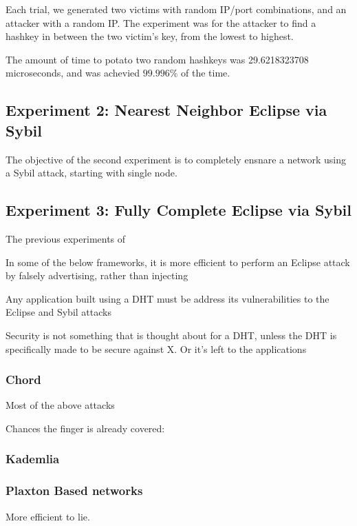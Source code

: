 \documentclass[10pt,a4paper]{article}
\begin{document}
Each trial, we generated two victims with random IP/port combinations, and an attacker with a random IP.
The experiment was for the attacker to find a hashkey in between the two victim's key, from the lowest to highest.

The amount of time to potato two random hashkeys was 29.6218323708 microseconds, and was achevied $ 99.996\%$ of the time.



\subsection{Experiment 2:  Nearest Neighbor Eclipse via Sybil}
The objective of the second experiment is to completely ensnare a network using a Sybil attack, starting with single node.


\subsection{Experiment 3: Fully Complete Eclipse via Sybil}
The previous experiments of

In some of the below frameworks, it is more efficient to perform an Eclipse attack by falsely advertising, rather than injecting





Any application built using a DHT must be address its vulnerabilities to the Eclipse and Sybil attacks

Security is not something that is thought about for a DHT, unless the 
DHT is specifically made to be secure against X.  
Or it's left to the applications



\subsubsection{Chord}
Most of the above attacks



Chances the finger is already covered:

\subsubsection{Kademlia}

\subsubsection{Plaxton Based networks}
More efficient to lie.
\end{document}
